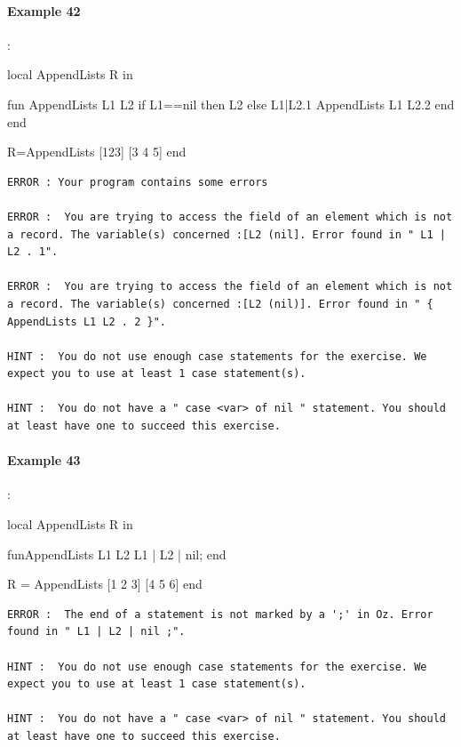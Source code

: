 \documentclass[11pt,a4paper,twoside,openright]{report}
\begin{document}
\paragraph{Example 42}:

\begin{OZ}
local AppendLists R in

	fun {AppendLists L1 L2}
		if L1==nil then L2
		else L1|L2.1 {AppendLists L1 L2.2}
		end
	end

R={AppendLists [123] [3 4 5]}
end
\end{OZ}

\begin{lstlisting}
ERROR : Your program contains some errors

ERROR :  You are trying to access the field of an element which is not a record. The variable(s) concerned :[L2 (nil]. Error found in " L1 | L2 . 1".

ERROR :  You are trying to access the field of an element which is not a record. The variable(s) concerned :[L2 (nil)]. Error found in " { AppendLists L1 L2 . 2 }".

HINT :  You do not use enough case statements for the exercise. We expect you to use at least 1 case statement(s).

HINT :  You do not have a " case <var> of nil " statement. You should at least have one to succeed this exercise.
\end{lstlisting}

\paragraph{Example 43}:

\begin{OZ}
local AppendLists R in

fun{AppendLists L1 L2}
L1 | L2 | nil;
end

R = {AppendLists [1 2 3] [4 5 6]}
end
\end{OZ}

\begin{lstlisting}
ERROR :  The end of a statement is not marked by a ';' in Oz. Error found in " L1 | L2 | nil ;".

HINT :  You do not use enough case statements for the exercise. We expect you to use at least 1 case statement(s).

HINT :  You do not have a " case <var> of nil " statement. You should at least have one to succeed this exercise.
\end{lstlisting}
\end{document}
